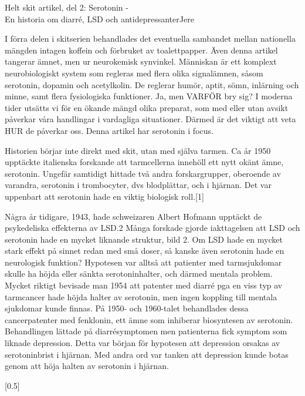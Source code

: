 \documentclass{spektraklet}
\begin{document}
\begin{artikel}{Helt skit artikel, del 2: Serotonin - \\ En historia om diarré, LSD och antidepressanter}{Jere}

I förra delen i skitserien behandlades det eventuella sambandet mellan nationella mängden intagen koffein och förbruket av toalettpapper. Även denna artikel tangerar ämnet, men ur neurokemisk synvinkel. Människan är ett komplext neurobiologiskt system som regleras med flera olika signalämnen, såsom serotonin, dopamin och acetylkolin. De reglerar humör, aptit, sömn, inlärning och minne, samt flera fysiologiska funktioner. Ja, men VARFÖR bry sig? I moderna tider utsätts vi för en ökande mängd olika preparat, som med eller utan avsikt påverkar våra handlingar i vardagliga situationer. Därmed är det viktigt att veta HUR de påverkar oss. Denna artikel har serotonin i focus.

Historien börjar inte direkt med skit, utan med själva tarmen. Ca år 1950 upptäckte italienska forskande att tarmcellerna innehöll ett nytt okänt ämne, serotonin. Ungefär samtidigt hittade två andra forskargrupper, oberoende av varandra, serotonin i trombocyter, dvs blodplättar, och i hjärnan. Det var uppenbart att serotonin hade en viktig biologisk roll.[1]

Några år tidigare, 1943, hade schweizaren Albert Hofmann upptäckt de psykedeliska effekterna av LSD.2 Många forskade gjorde iakttagelsen att LSD och serotonin hade en mycket liknande struktur, bild 2. Om LSD hade en mycket stark effekt på sinnet redan med små doser, så kanske även serotonin hade en neurologisk funktion? Hypotesen var alltså att patienter med tarmsjukdomar skulle ha höjda eller sänkta serotoninhalter, och därmed mentala problem. Mycket riktigt bevisade man 1954 att patenter med diarré pga en viss typ av tarmcancer hade höjda halter av serotonin, men ingen koppling till mentala sjukdomar kunde finnas. På 1950- och 1960-talet behandlades dessa cancerpatenter med fenklonin, ett ämne som inhiberar biosyntesen av serotonin. Behandlingen lättade på diarrésymptomen men patienterna fick symptom som liknade depression. Detta var början för hypotesen att depression orsakas av serotoninbrist i hjärnan. Med andra ord var tanken att depression kunde botas genom att höja halten av serotonin i hjärnan.


[0.5\columnwidth]


\end{artikel}
\end{document}
